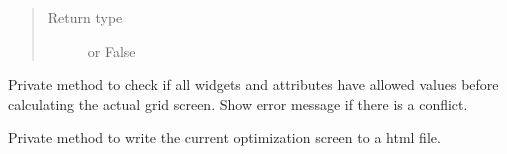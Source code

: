 \documentclass[letterpaper,10pt,english]{sphinxmanual}
\begin{document}
\begin{fulllineitems}
\begin{fulllineitems}
\begin{quote}
\begin{description}
\item[{Return type}] \leavevmode
{\hyperref[\detokenize{polo.crystallography:polo.crystallography.cocktail.UnitValue}]{}} or False

\end{description}\end{quote}

\end{fulllineitems}


\begin{fulllineitems}
\label{\detokenize{polo.widgets:polo.widgets.optimize_widget.OptimizeWidget._error_checker}}
Private method to check if all widgets and attributes have allowed 
values before calculating the actual grid screen. 
Show error message if there is a conflict.

\end{fulllineitems}


\begin{fulllineitems}
\label{\detokenize{polo.widgets:polo.widgets.optimize_widget.OptimizeWidget._export_screen}}
Private method to write the current optimization screen to a
html file.

\end{fulllineitems}



\end{fulllineitems}
\end{document}
